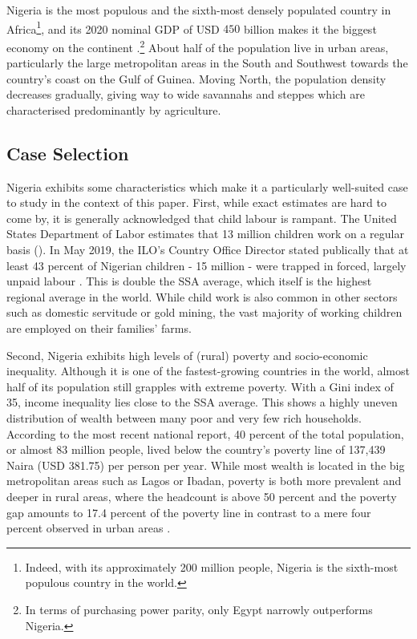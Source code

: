 \documentclass[a4paper,12pt]{article}
\theoremstyle{plain}
\theoremstyle{definition}
\theoremstyle{definition}
\theoremstyle{definition}
\theoremstyle{definition}
\begin{document}
Nigeria is the most populous and the sixth-most densely populated country in Africa\footnote{Indeed, with its approximately 200 million people, Nigeria is the sixth-most populous country in the world.}, and its 2020 nominal GDP of USD $450$ billion makes it the biggest economy on the continent \citep{WorldBank2021}.\footnote{In terms of purchasing power parity, only Egypt narrowly outperforms Nigeria.} About half of the population live in urban areas, particularly the large metropolitan areas in the South and Southwest towards the country's coast on the Gulf of Guinea. Moving North, the population density decreases gradually, giving way to wide savannahs and steppes which are characterised predominantly by agriculture.  

\subsection{Case Selection}
\label{sub:case_selection}
Nigeria exhibits some characteristics which make it a particularly well-suited case to study in the context of this paper. First, while exact estimates are hard to come by, it is generally acknowledged that child labour is rampant. The United States Department of Labor estimates that 13 million children work on a regular basis (\citeyear{USDepartmentofLabor2021}). In May 2019, the ILO's Country Office Director stated publically that at least 43 percent of Nigerian children - 15 million - were trapped in forced, largely unpaid labour \citep{ILO2019}. This is double the SSA average, which itself is the highest regional average in the world. While child work is also common in other sectors such as domestic servitude or gold mining, the vast majority of working children are employed on their families' farms.

Second, Nigeria exhibits high levels of (rural) poverty and socio-economic inequality. Although it is one of the fastest-growing countries in the world, almost half of its population still grapples with extreme poverty. With a Gini index of 35, income inequality lies close to the SSA average. This shows a highly uneven distribution of wealth between many poor and very few rich households. According to the most recent national report, 40 percent of the total population, or almost 83 million people, lived below the country's poverty line of 137,439 Naira (USD 381.75) per person per year. While most wealth is located in the big metropolitan areas such as Lagos or Ibadan, poverty is both more prevalent and deeper in rural areas, where the headcount is above 50 percent and the poverty gap amounts to 17.4 percent of the poverty line in contrast to a mere four percent observed in urban areas \citep{NBS2020}.
\end{document}
